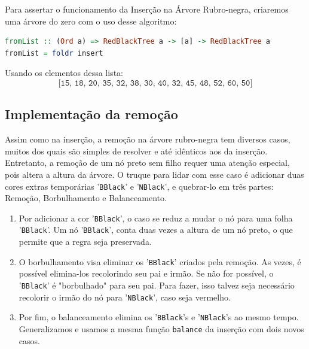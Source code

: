 Para assertar o funcionamento da Inserção na Árvore Rubro-negra, criaremos uma árvore do zero com o uso desse algoritmo:

\begin{lstlisting}[language=haskell]
fromList :: (Ord a) => RedBlackTree a -> [a] -> RedBlackTree a
fromList = foldr insert
\end{lstlisting}
\FloatBarrier

\noindent
Usando os elementos dessa lista:
$$
	\texttt{[15, 18, 20, 35, 32, 38, 30, 40, 32, 45, 48, 52, 60, 50]}
$$
\begin{figure}[!ht]
	\centering
\end{figure}
\FloatBarrier

\subsection{Implementação da remoção}

Assim como na inserção, a remoção na árvore rubro-negra tem diversos casos, muitos dos quais são simples de resolver e até idênticos aos da inserção. Entretanto, a remoção de um nó preto sem filho requer uma atenção especial, pois altera a altura da árvore. O truque para lidar com esse caso é adicionar duas cores extras temporárias '\texttt{BBlack}' e '\texttt{NBlack}', e quebrar-lo em três partes: Remoção, Borbulhamento e Balanceamento.



\begin{enumerate}
	\item Por adicionar a cor '\texttt{BBlack}', o caso se reduz a mudar o nó para uma folha '\texttt{BBlack}'. Um nó '\texttt{BBlack}', conta duas vezes a altura de um nó preto, o que permite que a regra seja preservada.
	\item O borbulhamento visa eliminar os '\texttt{BBlack}' criados pela remoção. As vezes, é possível elimina-los recolorindo seu pai e irmão. Se não for possível, o '\texttt{BBlack}' é  "borbulhado" para seu pai. Para fazer, isso talvez seja necessário recolorir o irmão do nó para '\texttt{NBlack}', caso seja vermelho.
	\item Por fim, o balanceamento elimina os '\texttt{BBlack}'s e '\texttt{NBlack}'s ao mesmo tempo. Generalizamos e usamos a mesma função \texttt{balance} da inserção com dois novos casos.
\end{enumerate}

